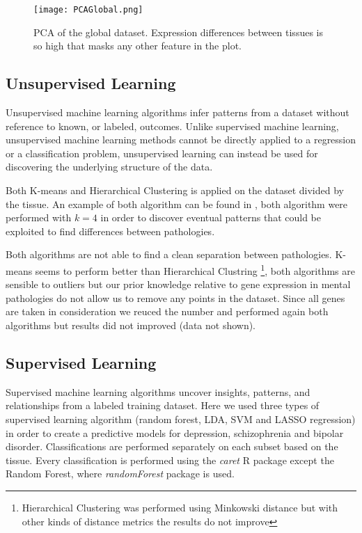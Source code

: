 \documentclass[11pt, onecolumn, twoside]{article}
\begin{document}
\begin{SCfigure*}
    \centering
    \texttt{[image: PCAGlobal.png]}
    \caption{PCA of the global dataset. Expression differences between tissues is so high that masks any other feature in the plot.}
    \label{fig:PCAGlobal}
\end{SCfigure*}

\subsection{Unsupervised Learning}
Unsupervised machine learning algorithms infer patterns from a dataset without reference to known, or labeled, outcomes.
Unlike supervised machine learning, unsupervised machine learning methods cannot be directly applied to a regression or a classification problem, unsupervised learning can instead be used for discovering the underlying structure of the data.

Both K-means and Hierarchical Clustering is applied on the dataset divided by the tissue.
An example of both algorithm can be found in , both algorithm were performed with $k=4$ in order to discover eventual patterns that could be exploited to find differences between pathologies.

Both algorithms are not able to find a clean separation between pathologies.
K-means seems to perform better than Hierarchical Clustring \footnote{Hierarchical Clustering was performed using Minkowski distance but with other kinds of distance metrics the results do not improve}, both algorithms are sensible to outliers but our prior knowledge relative to gene expression in mental pathologies do not allow us to remove any points in the dataset.
Since all genes are taken in consideration we reuced the number and performed again both algorithms but results did not improved (data not shown).

\subsection{Supervised Learning}\label{supervisedLerning}
Supervised machine learning algorithms uncover insights, patterns, and relationships from a labeled training dataset.
Here we used three types of supervised learning algorithm (random forest, LDA, SVM and LASSO regression) in order to create a predictive models for depression, schizophrenia and bipolar disorder.
Classifications are performed separately on each subset based on the tissue.
Every classification is performed using the \textit{caret} R package except the Random Forest, where \textit{randomForest} package is used.
\end{document}
